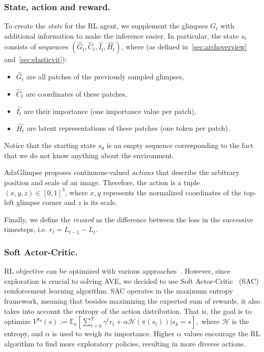 \documentclass[runningheads]{llncs}
\newcommand{\ent}{\mathcal{H}}
\newcommand{\ours}[0]{AdaGlimpse}
\begin{document}
\subsubsection{State, action and reward.}
\label{sec:state}
To create the \textit{state} for the RL agent, we supplement the glimpses $G_t$ with additional information to make the inference easier. In particular, the state $s_{t}$ consists of sequences $(\widehat{G}_t, \widehat{C}_t, \widehat{I_t}, \widehat{H_t})$, where (as defined in~\cref{sec:archoverview} and~\ref{sec:elasticvit}):
\begin{itemize}
\item $\widehat{G}_t$ are all patches of the previously sampled glimpses, 
\item $\widehat{C}_t$ are coordinates of these patches,
\item $\widehat{I_t}$ are their importance (one importance value per patch),
\item $\widehat{H_t}$ are latent representations of these patches (one token per patch).
\end{itemize}
Notice that the starting state $s_0$ is an empty sequence corresponding to the fact that we do not know anything about the environment.

\ours{} proposes continuous-valued \textit{actions} that describe the arbitrary position and scale of an image. Therefore, the action is a tuple $(x, y, z) \in [0, 1]^3$, where $x, y$ represents the normalized coordinates of the top-left glimpse corner and $z$ is its scale.

Finally, we define the \textit{reward} as the difference between the loss in the successive timesteps, i.e. $r_t = L_{t-1} - L_t$.

\subsubsection{Soft Actor-Critic.}
RL objective can be optimized with various approaches~\cite{sutton2018reinforcement}. However, since exploration is crucial to solving AVE, we decided to use Soft Actor-Critic~\cite{haarnoja2018soft} (SAC) reinforcement learning algorithm. SAC operates in the maximum entropy framework, meaning that besides maximizing the expected sum of rewards, it also takes into account the entropy of the action distribution. That is, the goal is to optimize 
$V^{\pi_\theta}(s) := \mathbb{E}_{\pi}\left[\sum_{t=k}^{T} \gamma^t r_t + \alpha\ent(\pi(s_t)) |s_k = s\right],$
where $\ent$ is the entropy, and $\alpha$ is used to weigh its importance. Higher $\alpha$ values encourage the RL algorithm to find more exploratory policies, resulting in more diverse actions.
\end{document}

